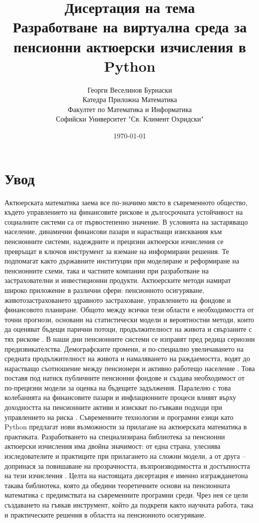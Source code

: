 \documentclass[12pt]{article}
\title{\textbf{Дисертация на тема
        \\[0.5em] \large{Разработване на виртуална среда за пенсионни актюерски изчисления в Python}}}
\author{Георги Веселинов Бурнаски
        \\ Катедра Приложна Математика
        \\ Факултет по Математика и Информатика
        \\ Софийски Университет "Св. Климент Охридски"}
\date{\today}
\begin{document}
\maketitle
\newpage
\section{Увод}

Актюерската математика заема все по-значимо място в съвременното общество, където управлението на финансовите рискове и дългосрочната устойчивост на социалните системи са от първостепенно значение.
\newline
\newline
В условията на застаряващо население, динамични финансови пазари и нарастващи изисквания към пенсионните системи, надеждните и прецизни актюерски изчисления се превръщат в ключов инструмент за вземане на информирани решения. Те подпомагат както държавните институции при моделиране и реформиране на пенсионните схеми, така и частните компании при разработване на застрахователни и инвестиционни продукти\cite{dalriada2023}.
\newline
\newline
Актюерските методи намират широко приложение в различни сфери: пенсионното осигуряване, животозастраховането здравното застраховане, управлението на фондове и финансовото планиране. Общото между всички тези области е необходимостта от точни прогнози, основани на статистически модели и вероятностни методи, които да оценяват бъдещи парични потоци, продължителност на живота и свързаните с тях рискове \cite{milliman2022}.
\newline
\newline
В наши дни пенсионните системи се изправят пред редица сериозни предизвикателства. Демографските промени, и по-специално увеличаването на средната продължителност на живота и намаляването на раждаемостта, водят до нарастващо съотношение между пенсионери и
активно работещо население \cite{bostonfed1999}. Това поставя под натиск публичните пенсионни фондове и създава необходимост от по-прецизни модели за оценка на бъдещите задължения. Паралелно с това колебанията на финансовите пазари и инфлационните процеси влияят върху доходността на пенсионните активи и изискват по-гъвкави подходи при управлението на риска \cite{ncpers2023}.
\newline
\newline
Съвременните технологии и програмни езици като Python предлагат нови възможности за прилагане на актюерската математика в практиката. Разработването на специализирана библиотека за пенсионни актюерски изчисления има двойна значимост: от една страна, улеснява изследователите и практиците при прилагането на сложни модели, а от друга – допринася за повишаване на прозрачността, възпроизводимостта и достъпността на тези изчисления \cite{lifelib2024, hyperexponential2023}.
\newline
\newline
Целта на настоящата дисертация е именно изгражданетона такава библиотека, която да обедини теоретичните основи на пенсионната математика с предимствата на съвременните програмни среди. Чрез нея се цели създаването на гъвкав инструмент, който да подкрепя както научната работа, така
и практическите решения в областта на пенсионното осигуряване.
\newpage
\end{document}
